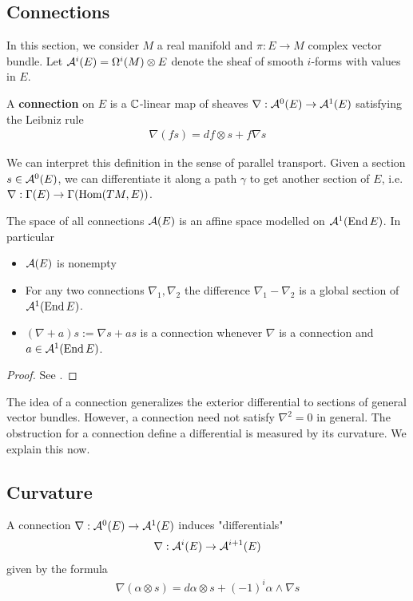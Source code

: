 \subsection{Connections}
In this section, we consider $M$ a real manifold and $\pi:E\to M$ complex vector bundle.
Let ${\mathcal{A}}^i(E) = \Omega^i(M) \otimes E$ denote the sheaf of smooth $i$-forms with values in $E$.
\begin{definition}
    A \textbf{connection} on $E$ 
    is a $\mathbb{C}$-linear map of sheaves
    $\nabla:{\mathcal{A}}^0(E)\to{\mathcal{A}}^1(E)$ satisfying the Leibniz rule
    \begin{align*}
        \nabla(fs) = df\otimes s + f\nabla s
    \end{align*}
\end{definition}
We can interpret this definition in the sense of parallel transport. Given 
a section $s\in{\mathcal{A}}^0(E)$, we can differentiate it along a path $\gamma$ to get another 
section of $E$, i.e. $\nabla:\Gamma(E)\to \Gamma(\operatorname{Hom}(TM,E))$.
\begin{theorem}
    The space of all connections ${\mathcal{A}}(E)$ is an affine space modelled on ${\mathcal{A}}^1(\operatorname{End} E)$. In particular \begin{itemize}
        \item ${\mathcal{A}}(E)$ is nonempty
        \item For any two connections $\nabla_1,\nabla_2$ the difference $\nabla_1-\nabla_2$ 
        is a global section of ${\mathcal{A}}^1(\operatorname{End} E)$.
        \item $(\nabla + a)s := \nabla s + as$ is a connection whenever $\nabla$ is a connection and 
        $a\in{\mathcal{A}}^1(\operatorname{End} E)$.
    \end{itemize}
\end{theorem}
\begin{proof}
    See \cite{huybrechts}.
\end{proof}
The idea of a connection generalizes the exterior differential to sections of general vector bundles. 
However, a connection need not satisfy $\nabla^2 = 0$ in general. The obstruction for a connection
define a differential is measured by its curvature. We explain this now.

\subsection{Curvature}

A connection $\nabla:{\mathcal{A}}^0(E)\to {\mathcal{A}}^1(E)$ induces "differentials" \begin{align*}
    \nabla:{\mathcal{A}}^i(E)\to{\mathcal{A}}^{i+1}(E)
\end{align*} given by the formula \begin{align*}
    \nabla(\alpha\otimes s) = d\alpha\otimes s + (-1)^i\alpha\wedge\nabla s
\end{align*}

